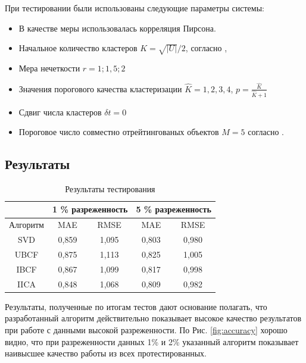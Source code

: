 \documentclass[a4paper, 12pt]{article} %
\begin{document}
При тестировании были использованы следующие параметры системы: 
\begin{itemize}
\item В качестве меры использовалась корреляция Пирсона.
\item Начальное количество кластеров $K = \sqrt{|U|} / 2$, согласно \cite{bees}, 
\item Мера нечеткости $r = 1; 1,5; 2$
\item Значения порогового качества кластеризации $\hat{K} = 1, 2, 3, 4$, $p=\frac{\hat{K}}{\hat{K} + 1}$ 
\item Сдвиг числа кластеров $\delta t = 0$
\item Пороговое число совместно отрейтингованых объектов $M = 5$ согласно \cite{itercf}.
\end{itemize}

\subsection{Результаты}



\begin{table}[h!]
	\begin{center}
		\begin{tabular}{|c|c|c|c|c|}
		\hline
		 & \multicolumn{2}{|c|}{ 1 \% разреженность} & \multicolumn{2}{|c|}{ 5 \% разреженность} \\
		 \hline
		 Алгоритм & MAE & RMSE & MAE & RMSE \\
		 \hline
		 SVD & 0,859 & 1,095 & 0,803 & 0,980 \\
		 \hline
		 UBCF & 0,875 & 1,113 & 0,825  & 1,005\\
		 \hline
		 IBCF & 0,867 & 1,099 & 0,817 &  0,998 \\ 
		 \hline
		 IICA & 0,848 & 1,068& 0,809 & 0,982 \\
		 \hline
		 
		\end{tabular}
		
	\end{center}
		\caption{Результаты тестирования}
		\label{tab:res}
	\end{table}
	
	Результаты, полученные по итогам тестов дают основание полагать, что разработанный алгоритм действительно показывает высокое качество результатов при работе с данными высокой разреженности. По Рис. \ref{fig:accuracy} хорошо видно, что при разреженности данных 1\% и 2\% указанный алгоритм показывает наивысшее качество работы из всех протестированных.
\end{document}

